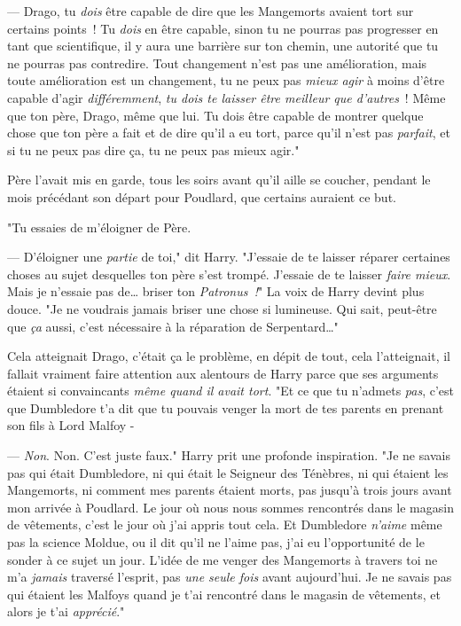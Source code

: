 --- Drago, tu \emph{dois} être capable de dire que les Mangemorts avaient tort sur certains points~! Tu \emph{dois} en être capable, sinon tu ne pourras pas progresser en tant que scientifique, il y aura une barrière sur ton chemin, une autorité que tu ne pourras pas contredire. Tout changement n'est pas une amélioration, mais toute amélioration est un changement, tu ne peux pas \emph{mieux agir} à moins d'être capable d'agir \emph{différemment}, \emph{tu dois te laisser être meilleur que d'autres}~! Même que ton père, Drago, même que lui. Tu dois être capable de montrer quelque chose que ton père a fait et de dire qu'il a eu tort, parce qu'il n'est pas \emph{parfait}, et si tu ne peux pas dire ça, tu ne peux pas mieux agir."

Père l'avait mis en garde, tous les soirs avant qu'il aille se coucher, pendant le mois précédant son départ pour Poudlard, que certains auraient ce but.

"Tu essaies de m'éloigner de Père.

--- D'éloigner une \emph{partie} de toi," dit Harry. "J'essaie de te laisser réparer certaines choses au sujet desquelles ton père s'est trompé. J'essaie de te laisser \emph{faire mieux}. Mais je n'essaie pas de… briser ton \emph{Patronus~!}" La voix de Harry devint plus douce. "Je ne voudrais jamais briser une chose si lumineuse. Qui sait, peut-être que \emph{ça} aussi, c'est nécessaire à la réparation de Serpentard…"

Cela atteignait Drago, c'était ça le problème, en dépit de tout, cela l'atteignait, il fallait vraiment faire attention aux alentours de Harry parce que ses arguments étaient si convaincants \emph{même quand il avait tort}. "Et ce que tu n'admets \emph{pas}, c'est que Dumbledore t'a dit que tu pouvais venger la mort de tes parents en prenant son fils à Lord Malfoy -

--- \emph{Non}. Non. C'est juste faux." Harry prit une profonde inspiration. "Je ne savais pas qui était Dumbledore, ni qui était le Seigneur des Ténèbres, ni qui étaient les Mangemorts, ni comment mes parents étaient morts, pas jusqu'à trois jours avant mon arrivée à Poudlard. Le jour où nous nous sommes rencontrés dans le magasin de vêtements, c'est le jour où j'ai appris tout cela. Et Dumbledore \emph{n'aime} même pas la science Moldue, ou il dit qu'il ne l'aime pas, j'ai eu l'opportunité de le sonder à ce sujet un jour. L'idée de me venger des Mangemorts à travers toi ne m'a \emph{jamais} traversé l'esprit, pas \emph{une seule fois} avant aujourd'hui. Je ne savais pas qui étaient les Malfoys quand je t'ai rencontré dans le magasin de vêtements, et alors je t'ai \emph{apprécié}."

